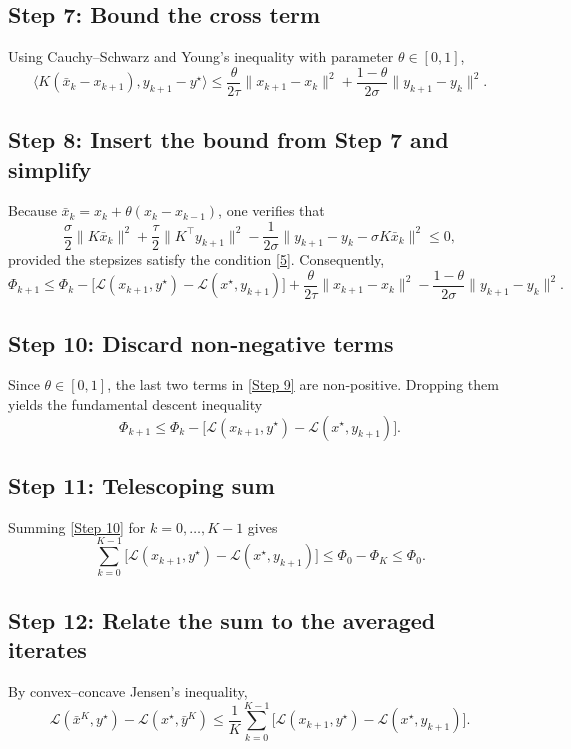 \documentclass[11pt]{article}
\newcommand{\inner}[2]{\langle #1,#2\rangle}
\newcommand{\norm}[1]{\|#1\|}
\begin{document}
\subsection*{Step 7: Bound the cross term}
Using Cauchy–Schwarz and Young’s inequality with parameter $\theta\in[0,1]$,
\[
\inner{K(\bar{x}_{k}-x_{k+1})}{y_{k+1}-y^{\star}}
\le
\frac{\theta}{2\tau}\norm{x_{k+1}-x_{k}}^{2}
+\frac{1-\theta}{2\sigma}\norm{y_{k+1}-y_{k}}^{2}.
\tag{Step 7}
\]

\subsection*{Step 8: Insert the bound from Step 7 and simplify}
Because $\bar{x}_{k}=x_{k}+\theta(x_{k}-x_{k-1})$, one verifies that
\[
\frac{\sigma}{2}\norm{K\bar{x}_{k}}^{2}
+ \frac{\tau}{2}\norm{K^{\!\top}y_{k+1}}^{2}
- \frac{1}{2\sigma}\norm{y_{k+1}-y_{k}-\sigma K\bar{x}_{k}}^{2}
\le
0,
\tag{Step 8}
\]
provided the stepsizes satisfy the condition \eqref{5}. Consequently,
\[
\Phi_{k+1}
\le
\Phi_{k}
- \bigl[\mathcal{L}(x_{k+1},y^{\star})-\mathcal{L}(x^{\star},y_{k+1})\bigr]
+ \frac{\theta}{2\tau}\norm{x_{k+1}-x_{k}}^{2}
- \frac{1-\theta}{2\sigma}\norm{y_{k+1}-y_{k}}^{2}.
\tag{Step 9}
\]

\subsection*{Step 10: Discard non‑negative terms}
Since $\theta\in[0,1]$, the last two terms in \eqref{Step 9} are non‑positive. Dropping them yields the fundamental descent inequality
\[
\Phi_{k+1}
\le
\Phi_{k}
- \bigl[\mathcal{L}(x_{k+1},y^{\star})-\mathcal{L}(x^{\star},y_{k+1})\bigr].
\tag{Step 10}
\]

\subsection*{Step 11: Telescoping sum}
Summing \eqref{Step 10} for $k=0,\dots,K-1$ gives
\[
\sum_{k=0}^{K-1}\bigl[\mathcal{L}(x_{k+1},y^{\star})-\mathcal{L}(x^{\star},y_{k+1})\bigr]
\le
\Phi_{0}-\Phi_{K}
\le
\Phi_{0}.
\tag{Step 11}
\]

\subsection*{Step 12: Relate the sum to the averaged iterates}
By convex–concave Jensen’s inequality,
\[
\mathcal{L}(\bar{x}^{K},y^{\star})-\mathcal{L}(x^{\star},\bar{y}^{K})
\le
\frac{1}{K}\sum_{k=0}^{K-1}\bigl[\mathcal{L}(x_{k+1},y^{\star})-\mathcal{L}(x^{\star},y_{k+1})\bigr].
\tag{Step 12}
\]
\end{document}
